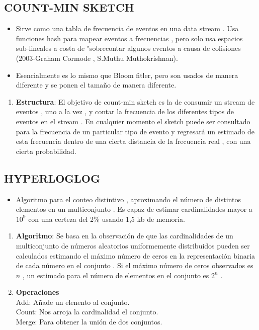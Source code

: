 \documentclass[journal]{IEEEtran}
\begin{document}
\begin{itemize}
\subsection{COUNT-MIN SKETCH}
\begin{itemize}
    \item Sirve como una tabla de frecuencia de eventos en una data stream . Usa funciones hash para mapear eventos a frecuencias , pero solo usa espacios sub-lineales a costa de "sobrecontar algunos eventos a causa de colisiones (2003-Graham Cormode , S.Muthu Muthokrishnan).
    \item Esencialmente es lo mismo que Bloom fitler, pero son usados de manera diferente y se ponen el tamaño de manera diferente.
\end{itemize}
\begin{enumerate}
    \item {\bf Estructura}: El objetivo de count-min sketch es la de consumir un stream de eventos , uno a la vez , y contar la frecuencia de los diferentes tipos de eventos en el stream . En cualquier momento el sketch puede ser consultado para la frecuencia de un particular tipo de evento y regresará un estimado de esta frecuencia dentro de una cierta distancia de la frecuencia real , con una cierta probabilidad.
\end{enumerate}
\subsection{HYPERLOGLOG}
\begin{itemize}
    \item Algoritmo para el conteo distintivo , aproximando el número de distintos elementos en un multiconjunto . Es capaz de estimar cardinalidades mayor a $10^9$ con una certeza del 2\% usando 1,5 kb de memoria.
\end{itemize}
\begin{enumerate}
    \item {\bf Algoritmo}: Se basa en la observación de que las cardinalidades de un multiconjunto de números aleatorios uniformemente distribuidos pueden ser calculados estimando el máximo número de ceros en la representación binaria de cada número en el conjunto . Si el máximo número de ceros observados es $n$ , un estimado para el número de elementos en el conjunto es $2^n$ .
    \item {\bf Operaciones} \\
    Add: Añade un elenento al conjunto.\\
    Count: Nos arroja la cardinalidad el conjunto.\\
     Merge: Para obtener la unión de dos conjuntos.
\end{enumerate}
\end{itemize}
\end{document}
